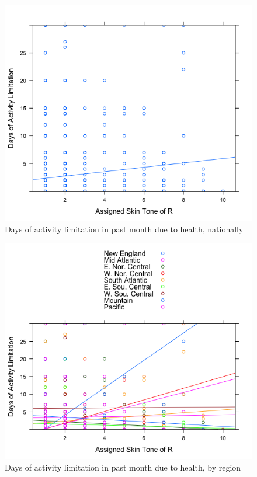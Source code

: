 \documentclass{article}
\begin{document}
\begin{figure}[H]
\centering
\includegraphics[scale=.3]{nationalactivitylimitation.png}
\caption{Days of activity limitation in past month due to health, nationally}
\label{fig:activitynational}
\end{figure}
\begin{figure}[H]
\centering
\includegraphics[scale=.3]{regionalactivity.png}
\caption{Days of activity limitation in past month due to health, by region}
\label{fig:activityregional}
\end{figure}
\end{document}

